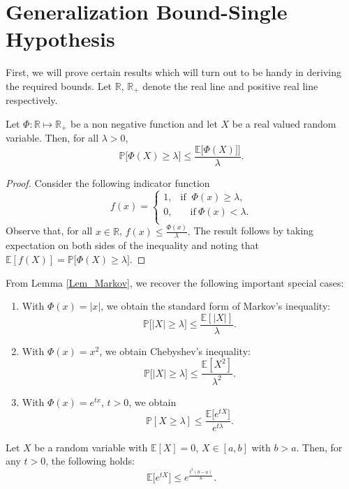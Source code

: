 \documentclass[a4paper,english,12pt]{article}
\begin{document}
\section{Generalization Bound-Single Hypothesis}
First, we will prove certain results which will turn out to be handy in deriving the required bounds. Let $\mathbb{R}$, $\mathbb{R}_+$ denote the real line and positive real line respectively. 

\begin{lem}
Let $\Phi:\mathbb{R} \mapsto \mathbb{R}_+$ be a non negative function and let $X$ be a real valued random variable. Then, for all $\lambda>0$, $$\mathbb{P}\big[\Phi(X)\geq \lambda\big]\leq \frac{\mathbb{E}\big[\Phi(X)\big]]}{\lambda}.$$ 
\label{Lem_Markov}
\end{lem}
\begin{proof}
Consider the following indicator function 
\begin{equation}
f(x)=
\begin{cases}

       1, &\text{if }~\Phi(x)\geq \lambda,\\
       0, &\quad\text{if}~\Phi(x)< \lambda. \\
\end{cases}
\end{equation}
Observe that, for all $x\in\mathbb{R}$, $f(x)\leq \frac{\Phi(x)}{\lambda}.$ The result follows by taking expectation on both sides of the inequality and noting that $\mathbb{E}[f(X)]=\mathbb{P}\big[\Phi(X)\geq \lambda\big]$. 
\end{proof}
\begin{rem}
From Lemma \ref{Lem_Markov}, we recover the following important special cases: 
\begin{enumerate}
\item With $\Phi(x)=|x|$, we obtain the standard form of Markov's inequality:   $$\mathbb{P}\big[|X|\geq \lambda\big]\leq \frac{\mathbb{E}[|X|]}{\lambda}.$$ 
\item With $\Phi(x)=x^2$, we obtain Chebyshev's inequality:$$\mathbb{P}\big[|X| \geq \lambda\big]\leq \frac{\mathbb{E}[X^2]}{\lambda^2}.$$ 
\item With $\Phi(x)=e^{tx}$, $t>0$, we obtain $$\mathbb{P}[X\geq \lambda]\leq \frac{\mathbb{E}\big[e^{tX}\big]}{e^{t\lambda }}.$$ 
\end{enumerate}

\end{rem}
\begin{thm}
Let $X$ be a random variable with $\mathbb{E}[X]=0$, $X\in[a,b]$ with $b>a$. Then, for any $t>0$, the following holds: $$\mathbb{E}\big[e^{tX}\big]\leq e^{\frac{t^2(b-a)}{8}}.$$
\label{Th_Hoeffding}
\end{thm}
\end{document}
